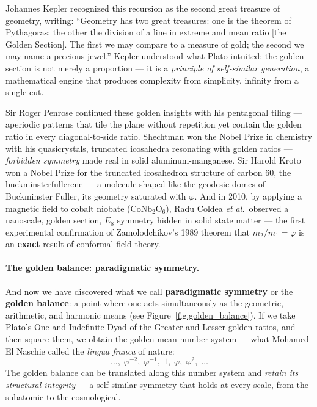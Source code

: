 \documentclass[10pt,a4paper]{article}
\begin{document}
Johannes Kepler recognized this recursion as the second great treasure
of geometry, writing: ``Geometry has two great treasures: one is the
theorem of Pythagoras; the other the division of a line in extreme and
mean ratio [the Golden Section]. The first we may compare to a measure
of gold; the second we may name a precious jewel.'' Kepler understood
what Plato intuited: the golden section is not merely a proportion ---
it is a \emph{principle of self-similar generation}, a mathematical
engine that produces complexity from simplicity, infinity from a single cut.

Sir Roger Penrose continued these golden insights with his pentagonal tiling ---
aperiodic patterns that tile the plane without repetition yet contain the golden
ratio in every diagonal-to-side ratio. Shechtman won the Nobel Prize in chemistry
with his quasicrystals, truncated icosahedra resonating with golden ratios ---
\emph{forbidden symmetry} made real in solid aluminum-manganese.
Sir Harold Kroto won a Nobel Prize for the truncated icosahedron structure of
carbon 60, the buckminsterfullerene --- a molecule shaped like the geodesic
domes of Buckminster Fuller, its geometry saturated with $\varphi$.
And in 2010, by applying a magnetic field to cobalt niobate
($\text{CoNb}_2\text{O}_6$), Radu Coldea \textit{et al.}\ observed a
nanoscale, golden section, $E_8$ symmetry hidden in solid state matter ---
the first experimental confirmation of Zamolodchikov's 1989 theorem that
$m_2/m_1 = \varphi$ is an \textbf{exact} result of conformal field theory.

\paragraph{The golden balance: paradigmatic symmetry.}
And now we have discovered what we call \textbf{paradigmatic symmetry}
or the \textbf{golden balance}: a point where one acts simultaneously
as the geometric, arithmetic, and harmonic means
(see Figure~\ref{fig:golden_balance}).
If we take Plato's One and Indefinite Dyad of the Greater and Lesser golden
ratios, and then square them, we obtain the golden mean number system ---
what Mohamed El Naschie called the \textit{lingua franca} of nature:
\[
  \ldots,\; \varphi^{-2},\; \varphi^{-1},\; 1,\; \varphi,\; \varphi^{2},\; \ldots
\]
The golden balance can be translated along this number system and
\emph{retain its structural integrity} --- a self-similar symmetry that
holds at every scale, from the subatomic to the cosmological.
\end{document}
